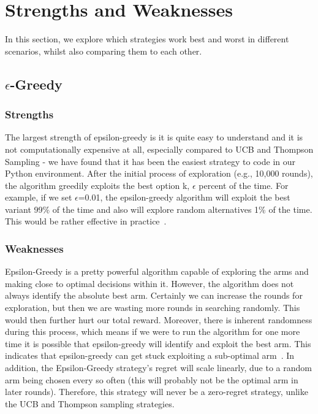 \section{Strengths and Weaknesses}\label{sec:strengths-and-weaknesses}
In this section, we explore which strategies work best and worst in different scenarios, whilst also comparing them to each other.

\subsection{$\epsilon$-Greedy}\label{subsec:$epsilon$-greedy}

\subsubsection{Strengths}
The largest strength of epsilon-greedy is it is quite easy to understand and it is not computationally expensive at all, especially compared to UCB and Thompson Sampling - we have found that it has been the easiest strategy to code in our Python environment.
After the initial process of exploration (e.g., 10,000 rounds), the algorithm greedily exploits the best option k, $\epsilon$ percent of the time.
For example, if we set $\epsilon$=0.01, the epsilon-greedy algorithm will exploit the best variant 99\% of the time and also will explore random alternatives 1\% of the time.
This would be rather effective in practice~\citep{ConorMc2018}.

\subsubsection{Weaknesses}
Epsilon-Greedy is a pretty powerful algorithm capable of exploring the arms and making close to optimal decisions within it.
However, the algorithm does not always identify the absolute best arm.
Certainly we can increase the rounds for exploration, but then we are wasting more rounds in searching randomly.
This would then further hurt our total reward.
Moreover, there is inherent randomness during this process, which means if we were to run the algorithm for one more time it is possible that epsilon-greedy will identify and exploit the best arm.
This indicates that epsilon-greedy can get stuck exploiting a sub-optimal arm~\citep{ConorMc2018}.
\newline
In addition, the Epsilon-Greedy strategy's regret will scale linearly, due to a random arm being chosen every so often (this will probably not be the optimal arm in later rounds).
Therefore, this strategy will never be a zero-regret strategy, unlike the UCB and Thompson sampling strategies.

